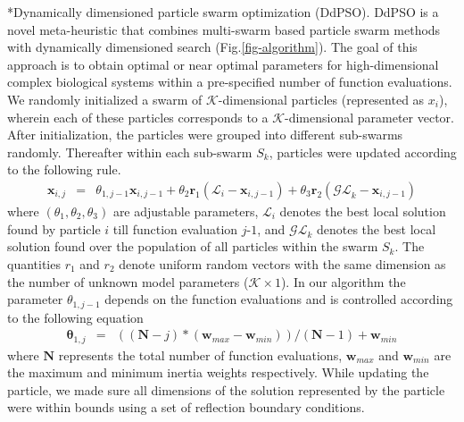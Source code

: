 \documentclass[12pt]{article}
\makeatletter
\renewcommand\subsection{\@startsection
	{subsection}{2}{0mm}
	{-0.05in}
	{-0.5\baselineskip}
	{\normalfont\normalsize\bfseries}}
\makeatother
\begin{document}
\subsection*{Dynamically dimensioned particle swarm optimization (DdPSO).}
DdPSO is a novel meta-heuristic that combines multi-swarm based particle swarm methods with dynamically dimensioned search (Fig.\ref{fig-algorithm}).
The goal of this approach is to obtain optimal or near optimal parameters for high-dimensional complex biological systems within a pre-specified number of function evaluations. We randomly initialized a swarm of $\mathcal{K}$-dimensional particles (represented as ${x}_{i}$), wherein each of these particles corresponds to a $\mathcal{K}$-dimensional parameter vector. After initialization, the particles were grouped into different sub-swarms randomly. Thereafter within each sub-swarm ${S}_{k}$,  particles were updated according to the following rule.
\begin{eqnarray}
	\mathbf{x}_{i,j} &=&\theta_{1,j-1}\mathbf{x}_{i,j-1} + \theta_{2}\mathbf{r}_{1}\left(\mathcal{L}_{i} - \mathbf{x}_{i,j-1}\right) + \theta_{3}\mathbf{r}_{2}\left(\mathcal{GL}_{k} - \mathbf{x}_{i,j-1}\right)
\end{eqnarray}
where $\left(\theta_{1},\theta_{2},\theta_{3}\right)$ are adjustable parameters, $\mathcal{L}_{i}$ denotes the best local solution found by particle $i$ till function evaluation $j$-$1$, and
$\mathcal{GL}_{k}$ denotes the best local solution found over the population of all particles within the swarm ${S}_{k}$. The quantities $r_{1}$ and $r_{2}$ denote uniform random vectors with the same dimension as the number of unknown model
parameters ($\mathcal{K}\times{1}$). In our algorithm the parameter $\theta_{1,j-1}$ depends on the function evaluations and is controlled according to the following equation
\begin{eqnarray}
	\mathbf \theta_{1,j}&=&((\mathbf{N}-{j})*(\mathbf{w}_{max}-\mathbf{w}_{min}))/(\mathbf{N}-{1}) + \mathbf{w}_{min}
\end{eqnarray}
where $\mathbf{N}$ represents the total number of function evaluations, $\mathbf{w}_{max}$ and $\mathbf{w}_{min}$ are the maximum and minimum inertia weights respectively. While updating the particle, we made sure all dimensions of the solution represented by the particle were within bounds using a set of reflection boundary conditions. 

\begin{algorithm}

\end{algorithm}
\end{document}
